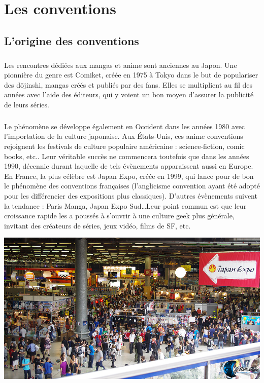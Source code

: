 \chapter{Les conventions}

\section{L'origine des conventions}

\paragraph{} Les rencontres dédiées aux mangas et anime sont anciennes au
Japon. Une pionnière du genre est Comiket, créée en 1975 à Tokyo dans le but de
populariser des d\=ojinshi, mangas créés et publiés par des fans. Elles se
multiplient au fil des années avec l'aide des éditeurs, qui y voient un bon
moyen d'assurer la publicité de leurs séries.

\paragraph{} Le phénomène se développe également en Occident dans les années
1980 avec l'importation de la culture japonaise. Aux États-Unis, ces anime
conventions rejoignent les festivals de culture populaire américaine :
science-fiction, comic books, etc.. Leur véritable succès ne commencera
toutefois que dans les années 1990, décennie durant laquelle de tels évènements
apparaissent aussi en Europe. En France, la plus célèbre est Japan Expo, créée
en 1999, qui lance pour de bon le phénomène des conventions françaises
(l'anglicisme convention ayant été adopté pour les différencier des expositions
plus classiques). D'autres évènements suivent la tendance : Paris Manga, Japan
Expo Sud\ldots Leur point commun est que leur croissance rapide les a poussés à
s'ouvrir à une culture geek plus générale, invitant des créateurs de séries,
jeux vidéo, films de SF, etc.

\begin{center}
	\includegraphics[scale=0.3]{japanexpo.jpg}
\end{center}

